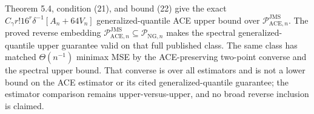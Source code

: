 Theorem 5.4, condition (21), and bound (22) give the exact \(C_{\gamma}r!16^r\delta^{-1}[A_n+64V_n]\) generalized-quantile ACE upper bound over \(\mathcal P_{\mathrm{ACE},n}^{\mathrm{JMS}}\). The proved reverse embedding \(\mathcal P_{\mathrm{ACE},n}^{\mathrm{JMS}}\subseteq\mathcal P_{\mathrm{NG},n}\) makes the spectral generalized-quantile upper guarantee valid on that full published class. The same class has matched \(\Theta(n^{-1})\) minimax MSE by the ACE-preserving two-point converse and the spectral upper bound. That converse is over all estimators and is not a lower bound on the ACE estimator or its cited generalized-quantile guarantee; the estimator comparison remains upper-versus-upper, and no broad reverse inclusion is claimed.